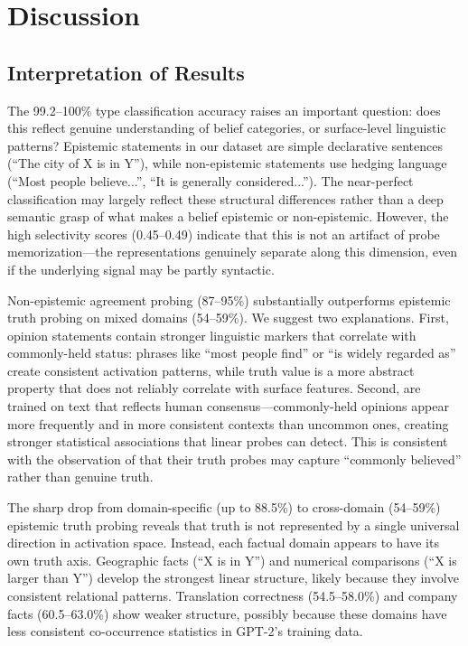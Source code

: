 \section{Discussion}
\label{sec:discussion}

\subsection{Interpretation of Results}

The 99.2--100\% type classification accuracy raises an important question: does this reflect genuine understanding of belief categories, or surface-level linguistic patterns? Epistemic statements in our dataset are simple declarative sentences (``The city of X is in Y''), while non-epistemic statements use hedging language (``Most people believe...'', ``It is generally considered...''). The near-perfect classification may largely reflect these structural differences rather than a deep semantic grasp of what makes a belief epistemic or non-epistemic. However, the high selectivity scores (0.45--0.49) indicate that this is not an artifact of probe memorization---the representations genuinely separate along this dimension, even if the underlying signal may be partly syntactic.

Non-epistemic agreement probing (87--95\%) substantially outperforms epistemic truth probing on mixed domains (54--59\%). We suggest two explanations. First, opinion statements contain stronger linguistic markers that correlate with commonly-held status: phrases like ``most people find'' or ``is widely regarded as'' create consistent activation patterns, while truth value is a more abstract property that does not reliably correlate with surface features. Second, \llms are trained on text that reflects human consensus---commonly-held opinions appear more frequently and in more consistent contexts than uncommon ones, creating stronger statistical associations that linear probes can detect. This is consistent with the observation of \citet{marks2023geometry} that their truth probes may capture ``commonly believed'' rather than genuine truth.

The sharp drop from domain-specific (up to 88.5\%) to cross-domain (54--59\%) epistemic truth probing reveals that truth is not represented by a single universal direction in activation space. Instead, each factual domain appears to have its own truth axis. Geographic facts (``X is in Y'') and numerical comparisons (``X is larger than Y'') develop the strongest linear structure, likely because they involve consistent relational patterns. Translation correctness (54.5--58.0\%) and company facts (60.5--63.0\%) show weaker structure, possibly because these domains have less consistent co-occurrence statistics in GPT-2's training data.

